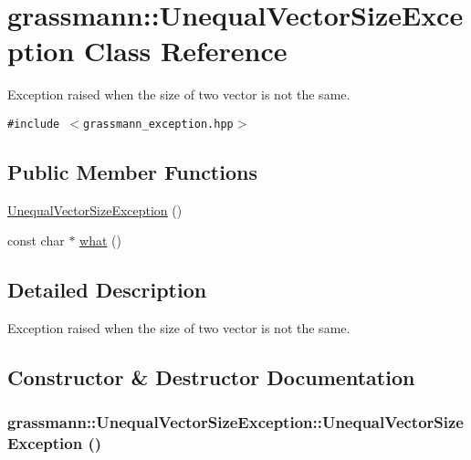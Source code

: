 \hypertarget{classgrassmann_1_1UnequalVectorSizeException}{
\section{grassmann::UnequalVectorSizeException Class Reference}
\label{classgrassmann_1_1UnequalVectorSizeException}
}
Exception raised when the size of two vector is not the same.  


{\tt \#include $<$grassmann\_\-exception.hpp$>$}

\subsection*{Public Member Functions}
\begin{CompactItemize}
\item 
\hyperlink{classgrassmann_1_1UnequalVectorSizeException_e5f6b203bdaf5c28474b2b61ac5d0fcc}{UnequalVectorSizeException} ()
\item 
const char $\ast$ \hyperlink{classgrassmann_1_1UnequalVectorSizeException_5c31aa718f295dfb49955081a23364d3}{what} ()
\end{CompactItemize}


\subsection{Detailed Description}
Exception raised when the size of two vector is not the same. 

\subsection{Constructor \& Destructor Documentation}
\hypertarget{classgrassmann_1_1UnequalVectorSizeException_e5f6b203bdaf5c28474b2b61ac5d0fcc}{
\subsubsection[UnequalVectorSizeException]{\setlength{\rightskip}{0pt plus 5cm}grassmann::UnequalVectorSizeException::UnequalVectorSizeException ()}}
\label{classgrassmann_1_1UnequalVectorSizeException_e5f6b203bdaf5c28474b2b61ac5d0fcc}




